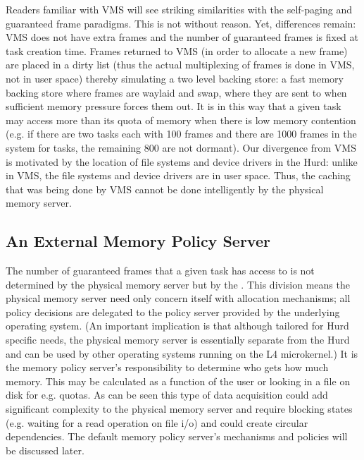 Readers familiar with VMS will see striking similarities with the
self-paging and guaranteed frame paradigms.  This is not without
reason.  Yet, differences remain: VMS does not have extra frames and
the number of guaranteed frames is fixed at task creation time.
Frames returned to VMS (in order to allocate a new frame) are placed
in a dirty list (thus the actual multiplexing of frames is done in
VMS, not in user space) thereby simulating a two level backing store:
a fast memory backing store where frames are waylaid and swap, where
they are sent to when sufficient memory pressure forces them out.  It
is in this way that a given task may access more than its quota of
memory when there is low memory contention (e.g. if there are two
tasks each with 100 frames and there are 1000 frames in the system for
tasks, the remaining 800 are not dormant).  Our divergence from VMS is
motivated by the location of file systems and device drivers in the
Hurd: unlike in VMS, the file systems and device drivers are in user
space.  Thus, the caching that was being done by VMS cannot be done
intelligently by the physical memory server.

\subsection{An External Memory Policy Server}

The number of guaranteed frames that a given task has access to is not
determined by the physical memory server but by the .  This division means the physical memory server need
only concern itself with allocation mechanisms; all policy decisions
are delegated to the policy server provided by the underlying
operating system.  (An important implication is that although tailored
for Hurd specific needs, the physical memory server is essentially
separate from the Hurd and can be used by other operating systems
running on the L4 microkernel.)  It is the memory policy server's
responsibility to determine who gets how much memory.  This may be
calculated as a function of the user or looking in a file on disk for
e.g. quotas.  As can be seen this type of data acquisition could add
significant complexity to the physical memory server and require
blocking states (e.g. waiting for a read operation on file i/o) and
could create circular dependencies.  The default memory policy
server's mechanisms and policies will be discussed later.

